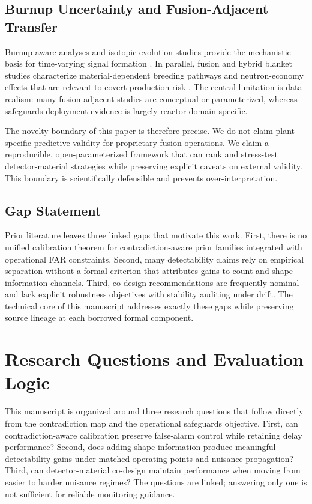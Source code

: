 \subsection{Burnup Uncertainty and Fusion-Adjacent Transfer}
Burnup-aware analyses and isotopic evolution studies provide the mechanistic basis for time-varying signal formation \citep{SRC006,SRC008,SRC014,SRC015,SRC021,SRC027,SRC001}. In parallel, fusion and hybrid blanket studies characterize material-dependent breeding pathways and neutron-economy effects that are relevant to covert production risk \citep{SRC007,SRC010,SRC019,SRC025,SRC026,SRC028,SRC033,SRC036}. The central limitation is data realism: many fusion-adjacent studies are conceptual or parameterized, whereas safeguards deployment evidence is largely reactor-domain specific.

The novelty boundary of this paper is therefore precise. We do not claim plant-specific predictive validity for proprietary fusion operations. We claim a reproducible, open-parameterized framework that can rank and stress-test detector-material strategies while preserving explicit caveats on external validity. This boundary is scientifically defensible and prevents over-interpretation.

\subsection{Gap Statement}
Prior literature leaves three linked gaps that motivate this work. First, there is no unified calibration theorem for contradiction-aware prior families integrated with operational FAR constraints. Second, many detectability claims rely on empirical separation without a formal criterion that attributes gains to count and shape information channels. Third, co-design recommendations are frequently nominal and lack explicit robustness objectives with stability auditing under drift. The technical core of this manuscript addresses exactly these gaps while preserving source lineage at each borrowed formal component.

\section{Research Questions and Evaluation Logic}\label{sec:research_questions}
This manuscript is organized around three research questions that follow directly from the contradiction map and the operational safeguards objective. First, can contradiction-aware calibration preserve false-alarm control while retaining delay performance? Second, does adding shape information produce meaningful detectability gains under matched operating points and nuisance propagation? Third, can detector-material co-design maintain performance when moving from easier to harder nuisance regimes? The questions are linked; answering only one is not sufficient for reliable monitoring guidance.

